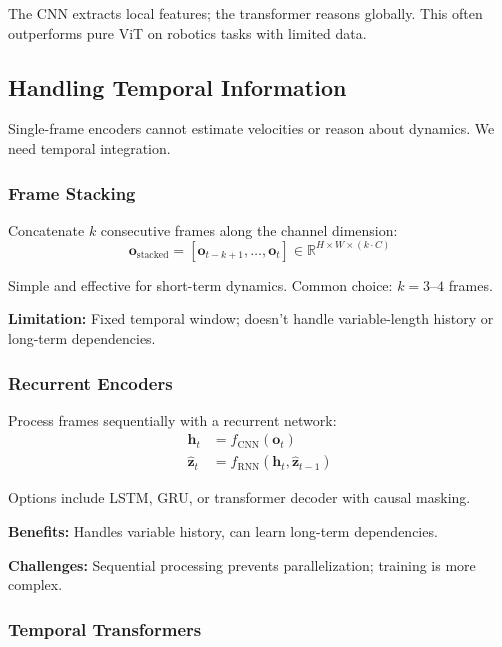 The CNN extracts local features; the transformer reasons globally. This often outperforms pure ViT on robotics tasks with limited data.

\subsection{Handling Temporal Information}

Single-frame encoders cannot estimate velocities or reason about dynamics. We need temporal integration.

\subsubsection{Frame Stacking}

Concatenate $k$ consecutive frames along the channel dimension:
\begin{equation}
\mathbf{o}_{\text{stacked}} = [\mathbf{o}_{t-k+1}, \ldots, \mathbf{o}_t] \in \mathbb{R}^{H \times W \times (k \cdot C)}
\label{eq:frame_stacking}
\end{equation}

Simple and effective for short-term dynamics. Common choice: $k = 3$--$4$ frames.

\textbf{Limitation:} Fixed temporal window; doesn't handle variable-length history or long-term dependencies.

\subsubsection{Recurrent Encoders}

Process frames sequentially with a recurrent network:
\begin{align}
\mathbf{h}_t &= f_{\text{CNN}}(\mathbf{o}_t) \\
\hat{\mathbf{z}}_t &= f_{\text{RNN}}(\mathbf{h}_t, \hat{\mathbf{z}}_{t-1})
\end{align}

Options include LSTM, GRU, or transformer decoder with causal masking.

\textbf{Benefits:} Handles variable history, can learn long-term dependencies.

\textbf{Challenges:} Sequential processing prevents parallelization; training is more complex.

\subsubsection{Temporal Transformers}

